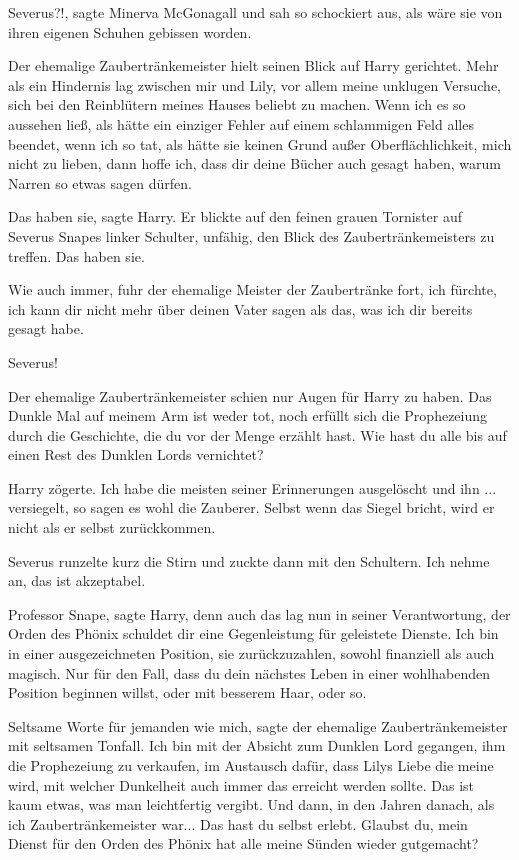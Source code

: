 \glqq{}Severus?!\grqq{}, sagte Minerva McGonagall und sah so schockiert aus, als
wäre sie von ihren eigenen Schuhen gebissen worden.

Der ehemalige Zaubertränkemeister hielt seinen Blick auf Harry gerichtet. \glqq{}
Mehr als ein Hindernis lag zwischen mir und Lily, vor allem meine unklugen
Versuche, sich bei den Reinblütern meines Hauses beliebt zu machen. Wenn ich es
so aussehen ließ, als hätte ein einziger Fehler auf einem schlammigen Feld alles
beendet, wenn ich so tat, als hätte sie keinen Grund außer Oberflächlichkeit,
mich nicht zu lieben, dann hoffe ich, dass dir deine Bücher auch gesagt haben,
warum Narren so etwas sagen dürfen.\grqq{}

\glqq{}Das haben sie\grqq{}, sagte Harry. Er blickte auf den feinen grauen
Tornister auf Severus Snapes linker Schulter, unfähig, den Blick des
Zaubertränkemeisters zu treffen. \glqq{}Das haben sie.\grqq{}

\glqq{}Wie auch immer\grqq{}, fuhr der ehemalige Meister der Zaubertränke fort,
\glqq{}ich fürchte, ich kann dir nicht mehr über deinen Vater sagen als das, was
ich dir bereits gesagt habe.\grqq{}

\glqq{}Severus!\grqq{}

Der ehemalige Zaubertränkemeister schien nur Augen für Harry zu haben. \glqq{}Das
Dunkle Mal auf meinem Arm ist weder tot, noch erfüllt sich die Prophezeiung
durch die Geschichte, die du vor der Menge erzählt hast. Wie hast du alle bis
auf einen Rest des Dunklen Lords vernichtet?\grqq{}

Harry zögerte. \glqq{}Ich habe die meisten seiner Erinnerungen ausgelöscht und
ihn ... versiegelt, so sagen es wohl die Zauberer. Selbst wenn das Siegel
bricht, wird er nicht als er selbst zurückkommen.\grqq{}

Severus runzelte kurz die Stirn und zuckte dann mit den Schultern. \glqq{}Ich
nehme an, das ist akzeptabel.\grqq{}

\glqq{}Professor Snape\grqq{}, sagte Harry, denn auch das lag nun in seiner
Verantwortung, \glqq{}der Orden des Phönix schuldet dir eine Gegenleistung für
geleistete Dienste. Ich bin in einer ausgezeichneten Position, sie
zurückzuzahlen, sowohl finanziell als auch magisch. Nur für den Fall, dass du
dein nächstes Leben in einer wohlhabenden Position beginnen willst, oder mit
besserem Haar, oder so.\grqq{}

\glqq{}Seltsame Worte für jemanden wie mich\grqq{}, sagte der ehemalige
Zaubertränkemeister mit seltsamen Tonfall. \glqq{}Ich bin mit der Absicht zum
Dunklen Lord gegangen, ihm die Prophezeiung zu verkaufen, im Austausch dafür,
dass Lilys Liebe die meine wird, mit welcher Dunkelheit auch immer das erreicht
werden sollte. Das ist kaum etwas, was man leichtfertig vergibt. Und dann, in
den Jahren danach, als ich Zaubertränkemeister war... Das hast du selbst erlebt.
Glaubst du, mein Dienst für den Orden des Phönix hat alle meine Sünden wieder
gutgemacht?\grqq{}

